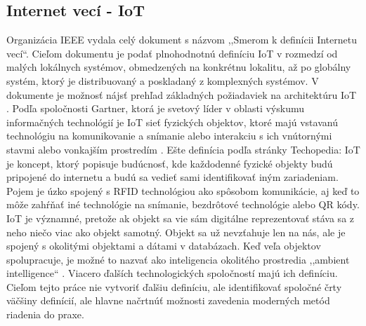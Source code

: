 \subsection{Internet vecí - IoT}
Organizácia IEEE vydala celý dokument  s názvom ,,Smerom k definícii Internetu vecí``. Cieľom dokumentu je podať plnohodnotnú definíciu IoT v rozmedzí od malých lokálnych systémov, obmedzených na konkrétnu lokalitu, až po globálny systém, ktorý je distribuovaný a poskladaný z komplexných systémov. V dokumente je možnosť nájsť prehľad základných požiadaviek na architektúru IoT \cite{IOT16}.
Podľa spoločnosti Gartner, ktorá je svetový líder v oblasti výskumu informačných technológií je IoT sieť fyzických objektov, ktoré majú vstavanú technológiu na komunikovanie a snímanie alebo interakciu s ich vnútornými stavmi alebo vonkajším prostredím \cite{IOT17}. 
Ešte definícia podľa stránky Techopedia: IoT je koncept, ktorý popisuje budúcnosť, kde každodenné fyzické objekty budú pripojené do internetu a budú sa vedieť sami identifikovať iným zariadeniam. Pojem je úzko spojený s RFID technológiou ako spôsobom komunikácie, aj keď to môže zahŕňať iné technológie na snímanie, bezdrôtové technológie alebo QR kódy.\\
\indent IoT je významné, pretože ak objekt sa vie sám digitálne reprezentovať stáva sa z neho niečo viac ako objekt samotný. Objekt sa už nevzťahuje len na nás, ale je spojený s okolitými objektami a dátami v databázach. Keď veľa objektov spolupracuje, je možné to nazvať ako inteligencia okolitého prostredia ,,ambient intelligence`` \cite{IOT18}.
Viacero ďalších technologických spoločností majú ich definíciu. Cieľom tejto práce nie vytvoriť ďalšiu definíciu, ale identifikovať spoločné črty väčšiny definícií, ale hlavne načrtnúť možnosti zavedenia moderných metód riadenia do praxe. 
